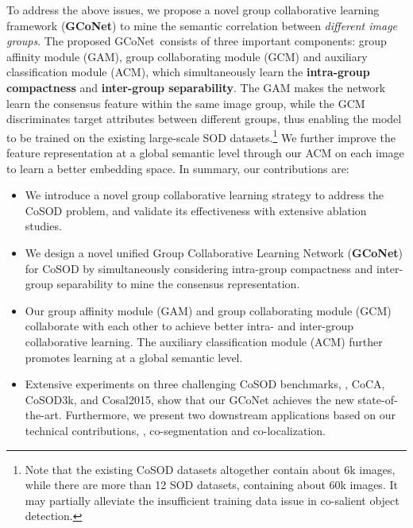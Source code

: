 \documentclass[final]{cvpr}
\def\ourmodel{GCoNet}
\begin{document}
To address the above issues, we propose a novel group collaborative learning framework (\textbf{\ourmodel}) to mine the semantic correlation between \textit{different image groups}. 
The proposed \ourmodel~consists of three important components:  group affinity module (GAM), group collaborating module (GCM) and auxiliary classification module (ACM), which simultaneously learn the \textbf{intra-group compactness} and \textbf{inter-group separability}. 
The GAM makes the network learn the consensus feature within the same image group, while the GCM discriminates target attributes between different groups, thus enabling the model to be trained on the existing large-scale SOD datasets.\footnote{Note that the existing CoSOD datasets altogether contain about 6k images, while there are more than 12 SOD datasets, containing about 60k images. It may partially alleviate the insufficient training data issue in co-salient object detection.}
We further improve the feature representation at a global semantic level through our ACM on each image to learn a better embedding space. 
In summary, our contributions are:
\begin{itemize}
    \item We introduce a novel group collaborative learning strategy to address the CoSOD problem, and validate its effectiveness with extensive ablation studies. 
    
    \item We design a novel unified Group Collaborative Learning Network (\textbf{\ourmodel}) for CoSOD by simultaneously considering intra-group compactness and inter-group separability to mine the consensus representation.
    
    \item Our group affinity module (GAM) and group collaborating module (GCM) collaborate with each other to achieve better intra- and inter-group collaborative learning. The auxiliary classification module (ACM) further promotes learning at a global semantic level.
    
    \item Extensive experiments on three challenging CoSOD benchmarks, \ie, CoCA, CoSOD3k, and Cosal2015, show that our {\ourmodel}  achieves the new state-of-the-art. Furthermore, we present two downstream applications based on our technical contributions, \ie, co-segmentation and co-localization. 
\end{itemize}
\end{document}
